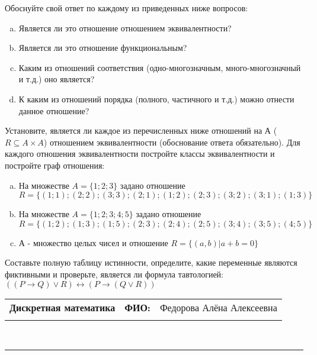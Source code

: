\documentclass[10pt]{exam}
\newcommand{\class}{Дискретная математика}
\newcommand{\examdate}{}
\begin{document}
\begin{questions}
Обоснуйте свой ответ по каждому из приведенных ниже вопросов:
\begin{enumerate} [a)]\setcounter{enumi}{0}
    \item Является ли это отношение отношением эквивалентности?
    \item Является ли это отношение функциональным?
    \item Каким из отношений соответствия (одно-многозначным, много-многозначный и т.д.) оно является?
    \item К каким из отношений порядка (полного, частичного и т.д.) можно отнести данное отношение?
\end{enumerate}
\question
Установите, является ли каждое из перечисленных ниже отношений на А ($R \subseteq A \times A$) отношением эквивалентности (обоснование ответа обязательно). Для каждого отношения эквивалентности постройте классы 
эквивалентности и постройте граф отношения:
\begin{enumerate} [a)]\setcounter{enumi}{0}
\item На множестве $A = \{1; 2; 3\}$ задано отношение $R = \{(1; 1); (2; 2); (3; 3); (2; 1); (1; 2); (2; 3); (3; 2); (3; 1); (1; 3)\}$
\item На множестве $A = \{1; 2; 3; 4; 5\}$ задано отношение $R = \{(1; 2); (1; 3); (1; 5); (2; 3); (2; 4); (2; 5); (3; 4); (3; 5); (4; 5)\}$
\item А - множество целых чисел и отношение $R = \{(a,b)|a + b = 0\}$
\end{enumerate}\question Составьте полную таблицу истинности, определите, какие переменные являются фиктивными и проверьте, является ли формула тавтологией:
$((P \rightarrow Q) \lor R) \leftrightarrow (P \rightarrow (Q \lor R))$

\end{questions}
\newpage
\begin{flushright}
\begin{tabular}{p{2.8in} r l}
\textbf{\class} & \textbf{ФИО:} &Федорова Алёна Алексеевна
\\

\textbf{\examdate} &&\\
\end{tabular}\\
\end{flushright}
\rule[1ex]{\textwidth}{.1pt}
\end{document}
